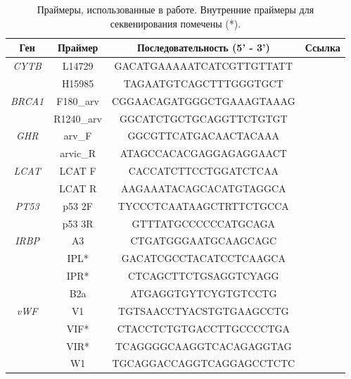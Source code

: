 \begin{table}[h!]
\caption{Праймеры, использованные в работе. Внутренние праймеры для секвенирования помечены (*).}\label{primers}

\begin{center}

\begin{tabular}{|c|c|c|c|}
	\hline 
\textbf{Ген}	& \textbf{Праймер} & \textbf{Последовательность (5' - 3')} & \textbf{Ссылка} \\ 
	\hline 
\multirow{2}{*}{\textit{CYTB}}	& L14729  & GACATGAAAAATCATCGTTGTTATT & \cite{Lebedev2007} \\ 
	\cline{2-4} 
		& H15985 & TAGAATGTCAGCTTTGGGTGCT & \cite{Ohdachi2001} \\ 
	\hline 

\multirow{2}{*}{\textit{BRCA1}}	& F180\_arv  & CGGAACAGATGGGCTGAAAGTAAAG & \multirow{2}{*}{\cite{Bannikova2013}}\\ 
\cline{2-3} 
& R1240\_arv & GGCATCTGCTGCAGGTTCTGTGT & \\ 
	\hline 

\multirow{2}{*}{\textit{GHR}}	& arv\_F  & GGCGTTCATGACAACTACAAA & \multirow{2}{*}{\cite{Abramson2009}}\\ 
\cline{2-3} 
& arvic\_R & ATAGCCACACGAGGAGAGGAACT & \\ 
\hline 

\multirow{2}{*}{\textit{LCAT}}	& LCAT F  & CACCATCTTCCTGGATCTCAA & \multirow{2}{*}{\cite{Abramson2009}}\\ 
\cline{2-3} 
& LCAT R & AAGAAATACAGCACATGTAGGCA & \\ 
\hline

\multirow{2}{*}{\textit{PT53}}	& p53 2F  & TYCCCTCAATAAGCTRTTCTGCCA & \multirow{2}{*}{\cite{Petrova2016}}\\ 
\cline{2-3} 
& p53 3R & GTTTATGCCCCCCATGCAGA & \\ 
\hline

\multirow{4}{*}{\textit{IRBP}}	& A3  & CTGATGGGAATGCAAGCAGC & \multirow{4}{*}{\cite{Petrova2016}}\\ 
\cline{2-3} 
& IPL* & GACATCGCCTACATCCTCAAGCA & \\ \cline{2-3} 
& IPR* & CTCAGCTTCTGSAGGTCYAGG & \\ \cline{2-3} 
& B2a & ATGAGGTGYTCYGTGTCCTG & \\
\hline

\multirow{4}{*}{\textit{vWF}}	& V1 & TGTSAACCTYACSTGTGAAGCCTG & \multirow{4}{*}{\cite{Poux2006}}\\ 
\cline{2-3} 
& VIF* & CTACCTCTGTGACCTTGCCCCTGA & \\ \cline{2-3} 
& VIR* & TCAGGGGCAAGGTCACAGAGGTAG & \\ \cline{2-3} 
& W1 & TGCAGGACCAGGTCAGGAGCCTCTC & \\
\hline


\end{tabular}
\end{center}
\end{table}
